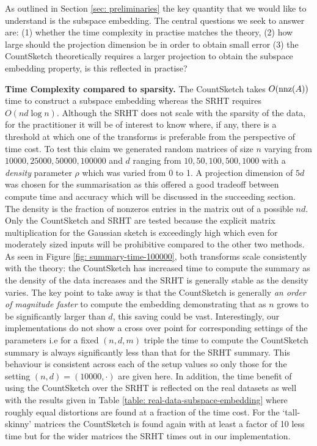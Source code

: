 
As outlined in Section \ref{sec: preliminaries} the key quantity that we would
like to understand is the subspace embedding.
The central questions we seek to answer are: (1) whether the time complexity
in practise matches the theory, (2) how large should the projection
dimension be in order to obtain small error (3) the CountSketch
theoretically requires a larger projection to obtain the subspace embedding
property, is this reflected in practise?

\noindent\textbf{Time Complexity compared to sparsity.} The CountSketch takes
$O(\text{nnz}(A))$ time to construct a subspace embedding
whereas the SRHT requires $O(nd \log n)$.
Although the SRHT does not scale with the sparsity of the data, for the
practitioner it
will be of interest to know where, if any, there is a threshold at which one of
the transforms is preferable from the perspective of time cost.
To test this claim we generated random matrices of size $n$ varying from
$10000, 25000, 50000, 100000$ and $d$ ranging from $10,50,100,500,1000$
with a \textit{density} parameter $\rho$ which was varied from 0 to 1.
A projection dimension of $5d$ was chosen for the summarisation as this offered
a good tradeoff between compute time and accuracy which will be discussed in the
succeeding section.
The density is the fraction of nonzeros entries in the matrix out of a possible
$nd$.
Only the CountSketch and SRHT are tested because the explicit matrix
multiplication for the Gaussian sketch is exceedingly high which even
for moderately sized inputs will be prohibitive compared to the other two methods.
As seen in Figure \ref{fig: summary-time-100000}, both transforms scale
consistently with the theory: the CountSketch has increased time to compute the
summary as the density of the data increases and the SRHT is generally stable as
the density varies.
The key point to take away is that the CountSketch is generally \textit{an order
of magnitude faster} to compute the embedding demonstrating that as $n$ grows
to be significantly larger than $d$, this saving could be vast.
Interestingly, our implementations do not show a cross over point for corresponding
settings of the parameters i.e for a fixed $(n,d,m)$ triple the time to compute the
CountSketch summary is always significantly less than that for
the SRHT summary.
This behaviour is consistent across each of the setup values so only those for
the setting $(n,d) = (10000, \cdot)$ are given here.
In addition, the time benefit of using the CountSketch over the SRHT is reflected
on the real datasets as well with the results given in Table
\ref{table: real-data-subspace-embedding}
where roughly equal distortions are found at a fraction of the time cost.
For the `tall-skinny' matrices the CountSketch is found again with at least a
factor of 10 less time but for the wider matrices the SRHT times out in our
implementation.

